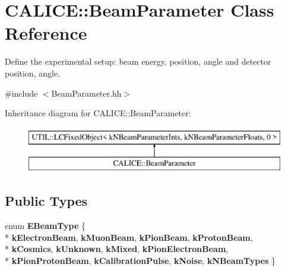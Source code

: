 \section{C\-A\-L\-I\-C\-E\-:\-:Beam\-Parameter Class Reference}
\label{classCALICE_1_1BeamParameter}


Define the experimental setup\-: beam energy, position, angle and detector position, angle.  




{\ttfamily \#include $<$Beam\-Parameter.\-hh$>$}

Inheritance diagram for C\-A\-L\-I\-C\-E\-:\-:Beam\-Parameter\-:\begin{figure}[H]
\begin{center}
\leavevmode
\includegraphics[height=2.000000cm]{classCALICE_1_1BeamParameter}
\end{center}
\end{figure}
\subsection*{Public Types}
\begin{DoxyCompactItemize}
\item 
enum {\bfseries E\-Beam\-Type} \{ \\*
{\bfseries k\-Electron\-Beam}, 
{\bfseries k\-Muon\-Beam}, 
{\bfseries k\-Pion\-Beam}, 
{\bfseries k\-Proton\-Beam}, 
\\*
{\bfseries k\-Cosmics}, 
{\bfseries k\-Unknown}, 
{\bfseries k\-Mixed}, 
{\bfseries k\-Pion\-Electron\-Beam}, 
\\*
{\bfseries k\-Pion\-Proton\-Beam}, 
{\bfseries k\-Calibration\-Pulse}, 
{\bfseries k\-Noise}, 
{\bfseries k\-N\-Beam\-Types}
 \}
\end{DoxyCompactItemize}

